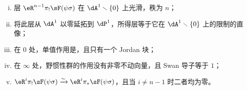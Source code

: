 \begin{theorem_}\label{VI:7-8}
\begin{enumerate}[(i)]
\item 层 $\eR^{n-1}\pi_!\sF(\psi\sigma)$ 在 $\dA^1\setminus\{0\}$ 上光滑，秩为 $n$；
\item 将此层从 $\dA^1$ 以零延拓到 $\dP^1$，所得层等于它在 $\dA^1\setminus\{0\}$ 上的限制的直像；
\item 在 $0$ 处，单值作用是，且只有一个 Jordan 块；
\item 在 $\infty$ 处，野惯性群的作用没有非零不动向量，且 Swan 导子等于 $1$；
\item $\eR^i\pi_!\sF(\psi\sigma)\iso\eR^i\pi_\ast\sF(\psi\sigma)$，且当 $i\ne n-1$ 时二者均为零。
\end{enumerate}
\end{theorem_}
